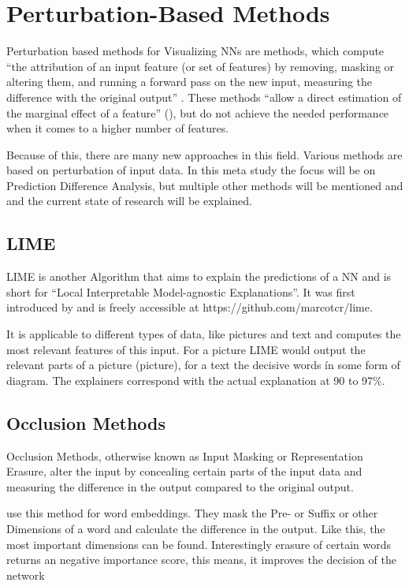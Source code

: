 \section{Perturbation-Based Methods}
Perturbation based methods for Visualizing NNs are methods, which compute “the attribution of an input feature (or set of features) by removing, masking or altering them, and running a forward pass on the new input, measuring the difference with the original output” .
These methods “allow a direct estimation of the marginal effect of a feature” (), but do not achieve the needed performance when it comes to a higher number of features.
\par
Because of this, there are many new approaches in this field.
Various methods are based on perturbation of input data. In this meta study the focus will be on Prediction Difference Analysis, but multiple other methods will be mentioned and and the current state of research will be explained.


\subsection{LIME}
LIME is another Algorithm that aims to explain the predictions of a NN and is short for “Local Interpretable Model-agnostic Explanations”. It was first introduced by  and is freely accessible at https://github.com/marcotcr/lime.
\par
It is applicable to different types of data, like pictures and text and computes the most relevant features of this input. For a picture LIME would output the relevant parts of a picture (picture), for a text the decisive words ín some form of diagram. The explainers correspond with the actual explanation at 90 to 97\%.

\subsection{Occlusion Methods}
Occlusion Methods, otherwise known as Input Masking or Representation Erasure, alter the input by concealing certain parts of the input data and measuring the difference in the output compared to the original output. 
\par
{} use this method for word embeddings. They mask the Pre- or Suffix or other Dimensions of a word and calculate the difference in the output. Like this, the most important dimensions can be found. Interestingly erasure of certain words returns an negative importance score, this means, it improves the decision of the network

